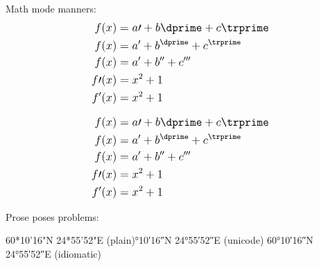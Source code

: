 \documentclass{article}
\begin{document}
\fontsize{12}{16}
\selectfont

Math mode manners:
\[\mathlarger{\begin{aligned}
	f(x) & = a\prime + b\dprime + c\trprime \\
	f(x) & = a^{\prime} + b^{\dprime} + c^{\trprime} \\
	f(x) & = a' + b'' + c''' \\
	f\prime(x) & = x^{2} + 1\\
	f'(x) & = x^{2} + 1
\end{aligned}}\]

\[\mathlarger{\begin{aligned}
	f(x) & = a\prime + b\dprime + c\trprime \\
	f(x) & = a^{\prime} + b^{\dprime} + c^{\trprime} \\
	f(x) & = a' + b'' + c''' \\
	f\prime(x) & = x^{2} + 1\\
	f'(x) & = x^{2} + 1
\end{aligned}}\]

Prose poses problems:
\smallskip

\raggedright{
	60*10'16"N 24*55'52"E (plain)°10′16″N 24°55′52″E (unicode)\break
	\ang{60;10;16}N \ang{24;55;52}E (idiomatic)
}
\end{document}
